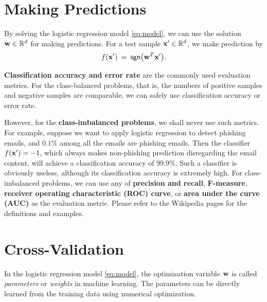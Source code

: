 \documentclass[11pt]{article}
\numberwithin{equation}{section}
\def\w{{\bf w}}
\def\x{{\bf x}}
\def\RB{{\mathbb R}}
\def\sgn{\mathsf{sgn}}
\begin{document}
\section{Making Predictions} \label{sec:predict}



By solving the logistic regression model \eqref{eq:model}, 
we can use the solution $\w \in \RB^d$ for making predictions.
For a test sample $\x' \in \RB^d$, we make prediction by
\begin{equation*}
f (\x')
\: = \: \sgn \big(  \w^T \x' \big) .
\end{equation*}

{\bf Classification accuracy and error rate} are the commonly used evaluation metrics.
For the class-balanced problems, that is, the numbers of positive samples and negative samples are comparable,
we can safely use classification accuracy or error rate.

However, for the {\bf class-imbalanced problems}, we shall never use such metrics.
For example, suppose we want to apply logistic regression to detect phishing emails,
and $0.1\%$ among all the emails are phishing emails.
Then the classifier $f (\x') = -1$, which always makes non-phishing prediction disregarding the email content, will achieve a classification accuracy of $99.9\%$.
Such a classifier is obviously useless, although its classification accuracy is extremely high.
For class-imbalanced problems, we can use any of {\bf precision and recall}, {\bf F-measure}, {\bf receiver operating characteristic (ROC) curve}, or {\bf area under the curve (AUC)} as the evaluation metric.
Please refer to the Wikipedia pages for the definitions and examples.


\section{Cross-Validation}



In the logistic regression model \eqref{eq:model}, the optimization variable $\w$ is called {\it parameters} or {\it weights} in machine learning.
The parameters can be directly learned from the training data using numerical optimization.
\end{document}

